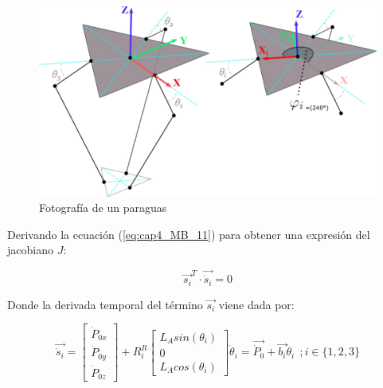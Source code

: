            \begin{figure}[htb]
                 \centering
                 \includegraphics[width=0.95\linewidth]{Main/Chapter4/Images4/DIBUJO33.jpg}
                  \caption{Fotografía de un paraguas}
                  \label{f:Cap4_Metodo_B_Modelacion_Cinematica_Posicion_5asdasdfvtk}
            \end{figure}  
            
            
            
    \newpage

            
    Derivando la ecuación (\ref{eq:cap4_MB_11}) para obtener una expresión del jacobiano $J$: 
    
    \begin{equation} 
            \overrightarrow{s_{i}}^T \cdot \overrightarrow{\dot{s}_{i}}= 0
            \label{eq:cap4_MB_1141}
        \end{equation} 
    
    Donde la derivada temporal del término $\overrightarrow{{s}_{i}}$ viene dada por:
    
    \begin{equation}
            \overrightarrow{\dot{s}_{i}}=\begin{bmatrix}
                \dot{P}_{0x} \\
                \dot{P}_{0y} \\
                \dot{P}_{0z}
            \end{bmatrix} +  R_{i}^{R}
            \begin{bmatrix}
                L_{A} sin(\theta_i) \\
                0\\
                L_{A} cos(\theta_i) 
            \end{bmatrix} \dot{\theta}_i = \overrightarrow{\dot{P}_0}+\overrightarrow{b_i}\dot{\theta}_i ~~; i \in \{1,2,3\}
        \label{eq:cap4_MB_12112}
    \end{equation}
    
